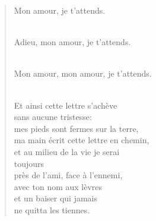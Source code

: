 \documentclass[11pt,a4paper]{book}
\begin{document}
\begin{verse}
Mon amour, je t'attends. \\ \

Adieu, mon amour, je t'attends. \\ \

Mon amour, mon amour, je t'attends. \\ \

\newpage

Et ainsi cette lettre s'achève \\
sans aucune tristesse: \\
mes pieds sont fermes sur la terre, \\
ma main écrit cette lettre en chemin, \\
et au milieu de la vie je serai \\
toujours \\
près de l'ami, face à l'ennemi, \\
avec ton nom aux lèvres \\
et un baiser qui jamais \\
ne quitta les tiennes.
\end{verse}

\cleardoublepage

\tableofcontents
\end{document}
